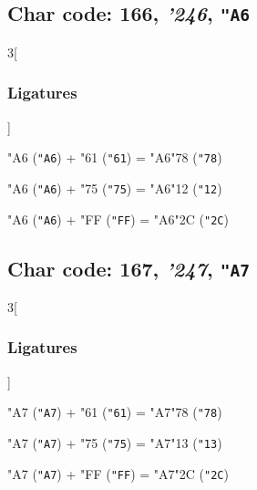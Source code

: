 \documentclass{article}
\newlength{\maxcharwidth}
\begin{document}
\subsection{Char code: 166, {\it'246}, {\tt"A6}}
\label{char_166}


\begin{multicols}{3}[\subsubsection{Ligatures}]

{\testfont\char"A6\noboundary} ({\tt"A6}) + {\testfont\char"61\noboundary} ({\tt"61}) = {\testfont\char"A6\noboundary}{\testfont\char"78\noboundary} ({\tt"78}) 

{\testfont\char"A6\noboundary} ({\tt"A6}) + {\testfont\char"75\noboundary} ({\tt"75}) = {\testfont\char"A6\noboundary}{\testfont\char"12\noboundary} ({\tt"12}) 

{\testfont\char"A6\noboundary} ({\tt"A6}) + {\testfont\char"FF\noboundary} ({\tt"FF}) = {\testfont\char"A6\noboundary}{\testfont\char"2C\noboundary} ({\tt"2C}) 

\end{multicols}

\subsection{Char code: 167, {\it'247}, {\tt"A7}}
\label{char_167}


\begin{multicols}{3}[\subsubsection{Ligatures}]

{\testfont\char"A7\noboundary} ({\tt"A7}) + {\testfont\char"61\noboundary} ({\tt"61}) = {\testfont\char"A7\noboundary}{\testfont\char"78\noboundary} ({\tt"78}) 

{\testfont\char"A7\noboundary} ({\tt"A7}) + {\testfont\char"75\noboundary} ({\tt"75}) = {\testfont\char"A7\noboundary}{\testfont\char"13\noboundary} ({\tt"13}) 

{\testfont\char"A7\noboundary} ({\tt"A7}) + {\testfont\char"FF\noboundary} ({\tt"FF}) = {\testfont\char"A7\noboundary}{\testfont\char"2C\noboundary} ({\tt"2C}) 

\end{multicols}
\end{document}
